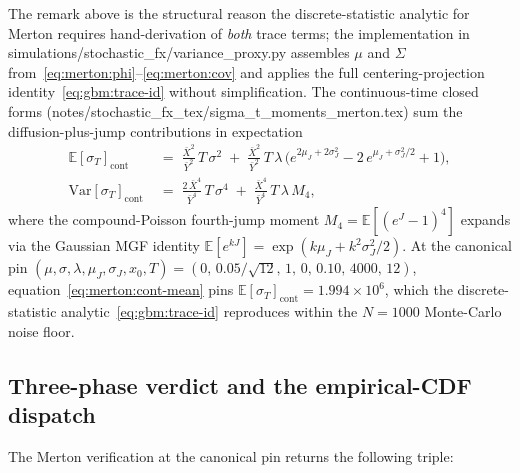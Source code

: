 \documentclass[11pt,letterpaper]{article}
\newcommand{\E}{\mathbb{E}}
\newcommand{\Var}{\text{Var}}
\newcommand{\sigmaT}{\sigma_{T}}
\newcommand{\Xbar}{\bar{X}}
\newcommand{\Ybar}{\bar{Y}}
\begin{document}
The remark above is the structural reason the discrete-statistic analytic
for Merton requires hand-derivation of \emph{both} trace terms; the
implementation in
\textsf{simulations/stochastic\_fx/variance\_proxy.py} assembles
$\mu$ and $\Sigma$ from~\eqref{eq:merton:phi}--\eqref{eq:merton:cov} and
applies the full centering-projection identity~\eqref{eq:gbm:trace-id}
without simplification. The continuous-time closed forms
(\textsf{notes/stochastic\_fx\_tex/sigma\_t\_moments\_merton.tex}) sum
the diffusion-plus-jump contributions in expectation
\begin{align}
    \E[\sigmaT]_{\text{cont}}
    \;&=\;
    \frac{\Xbar^{2}}{\Ybar^{2}}\,T\,\sigma^{2}
    \;+\;
    \frac{\Xbar^{2}}{\Ybar^{2}}\,T\,\lambda\,
    \bigl(e^{2\mu_{J} + 2\sigma_{J}^{2}}
          - 2\,e^{\mu_{J} + \sigma_{J}^{2}/2} + 1\bigr),
    \label{eq:merton:cont-mean}\\
    \Var[\sigmaT]_{\text{cont}}
    \;&=\;
    \frac{2\,\Xbar^{4}}{\Ybar^{4}}\,T\,\sigma^{4}
    \;+\;
    \frac{\Xbar^{4}}{\Ybar^{4}}\,T\,\lambda\,M_{4},
    \label{eq:merton:cont-var}
\end{align}
where the compound-Poisson fourth-jump moment $M_{4} = \E[(e^{J} - 1)^{4}]$
expands via the Gaussian MGF identity $\E[e^{kJ}] = \exp(k\mu_{J} +
k^{2}\sigma_{J}^{2}/2)$. At the canonical pin
$(\mu, \sigma, \lambda, \mu_{J}, \sigma_{J}, x_{0}, T) =
(0,\, 0.05/\sqrt{12},\, 1,\, 0,\, 0.10,\, 4000,\, 12)$,
equation~\eqref{eq:merton:cont-mean} pins $\E[\sigmaT]_{\text{cont}} =
1.994\times 10^{6}$, which the discrete-statistic
analytic~\eqref{eq:gbm:trace-id} reproduces within the
$N = 1000$ Monte-Carlo noise floor.

\subsection{Three-phase verdict and the empirical-CDF dispatch}
\label{sec:merton:verdict}

The Merton verification at the canonical pin returns the following triple:
\end{document}
